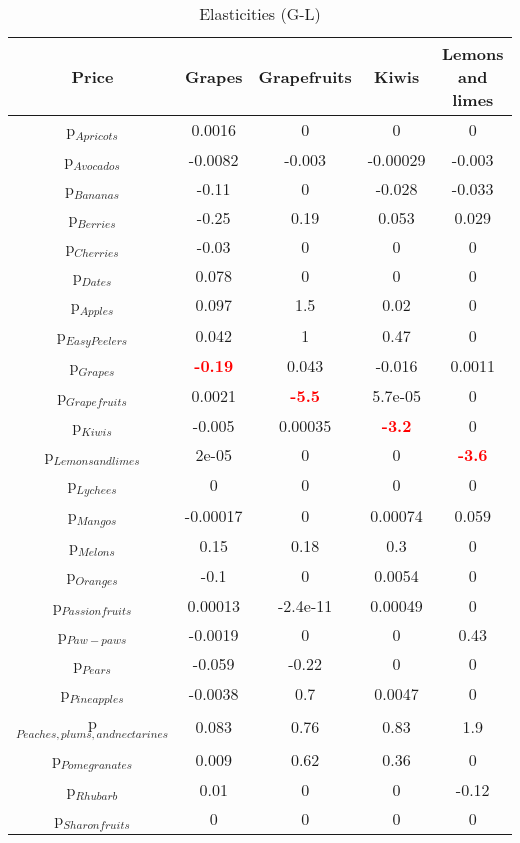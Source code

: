 \documentclass[11pt]{article}
\begin{document}
\begin{table}[h]
\caption{Elasticities (G-L)}
\label{Table: elasticities 3}
\begin{center}
\begin{tabular}{ccccc}
Price & Grapes & Grapefruits & Kiwis & Lemons and limes \\ \hline
p$_{Apricots}$ & 0.0016 & 0 & 0 & 0 \\ 
p$_{Avocados}$ & -0.0082 & -0.003 & -0.00029 & -0.003 \\ 
p$_{Bananas}$ & -0.11 & 0 & -0.028 & -0.033 \\ 
p$_{Berries}$ & -0.25 & 0.19 & 0.053 & 0.029 \\ 
p$_{Cherries}$ & -0.03 & 0 & 0 & 0 \\ 
p$_{Dates}$ & 0.078 & 0 & 0 & 0 \\ 
p$_{Apples}$ & 0.097 & 1.5 & 0.02 & 0 \\ 
p$_{Easy Peelers}$ & 0.042 & 1 & 0.47 & 0 \\ 
p$_{Grapes}$ & \textcolor{red}{\textbf{-0.19}} & 0.043 & -0.016 & 0.0011 \\ 
p$_{Grapefruits}$ & 0.0021 & \textcolor{red}{\textbf{-5.5}} & 5.7e-05 & 0 \\ 
p$_{Kiwis}$ & -0.005 & 0.00035 & \textcolor{red}{\textbf{-3.2}} & 0 \\ 
p$_{Lemons and limes}$ & 2e-05 & 0 & 0 & \textcolor{red}{\textbf{-3.6}} \\ 
p$_{Lychees}$ & 0 & 0 & 0 & 0 \\ 
p$_{Mangos}$ & -0.00017 & 0 & 0.00074 & 0.059 \\ 
p$_{Melons}$ & 0.15 & 0.18 & 0.3 & 0 \\ 
p$_{Oranges}$ & -0.1 & 0 & 0.0054 & 0 \\ 
p$_{Passion fruits}$ & 0.00013 & -2.4e-11 & 0.00049 & 0 \\ 
p$_{Paw-paws}$ & -0.0019 & 0 & 0 & 0.43 \\ 
p$_{Pears}$ & -0.059 & -0.22 & 0 & 0 \\ 
p$_{Pineapples}$ & -0.0038 & 0.7 & 0.0047 & 0 \\ 
p$_{Peaches, plums, and nectarines}$ & 0.083 & 0.76 & 0.83 & 1.9 \\ 
p$_{Pomegranates}$ & 0.009 & 0.62 & 0.36 & 0 \\ 
p$_{Rhubarb}$ & 0.01 & 0 & 0 & -0.12 \\ 
p$_{Sharon fruits}$ & 0 & 0 & 0 & 0 \\ 
\end{tabular}
\end{center}
\end{table}
\end{document}
